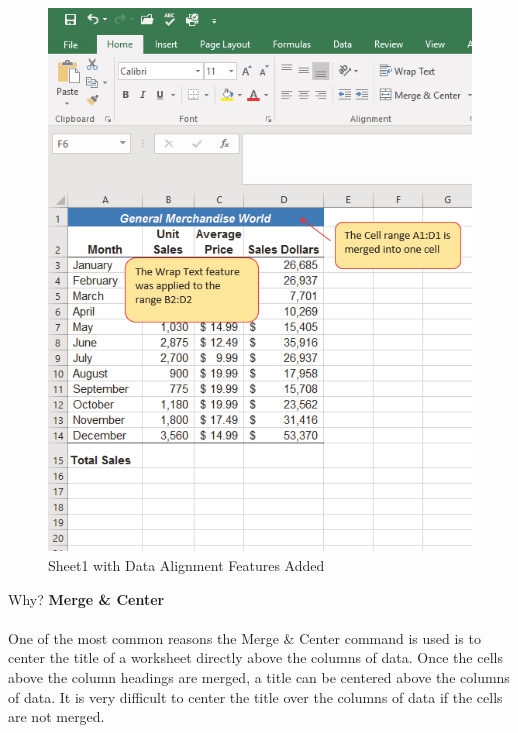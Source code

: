 \begin{figure}[H]
	\centering
	\includegraphics[width=\maxwidth{.95\linewidth}]{gfx/ch01_fig40}
	\caption{Sheet1 with Data Alignment Features Added}
	\label{01:fig40}
\end{figure}

\begin{center}
	\begin{infobox}{Why?}
		\textbf{Merge \& Center}
		\\
		\\
		One of the most common reasons the Merge \& Center command is used is to center the title of a worksheet directly above the columns of data. Once the cells above the column headings are merged, a title can be centered above the columns of data. It is very difficult to center the title over the columns of data if the cells are not merged.
	\end{infobox}
\end{center}

